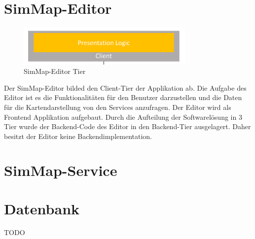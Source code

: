 \section{SimMap-Editor}
\begin{figure}[H]
\centering
\includegraphics[height=2cm]{images/presentationlayer.png}
\caption{SimMap-Editor Tier}
\label{tier_architecture}
\end{figure}
Der SimMap-Editor bilded den Client-Tier der Applikation ab. Die Aufgabe des Editor ist es die Funktionalitäten für den Benutzer darzustellen und die Daten für die Kartendarstellung von den Services anzufragen. Der Editor wird als Frontend Applikation aufgebaut. Durch die Aufteilung der Softwarelösung in 3 Tier wurde der Backend-Code des Editor in den Backend-Tier ausgelagert. Daher besitzt der Editor keine Backendimplementation.
\section{SimMap-Service}

\section{Datenbank}
TODO